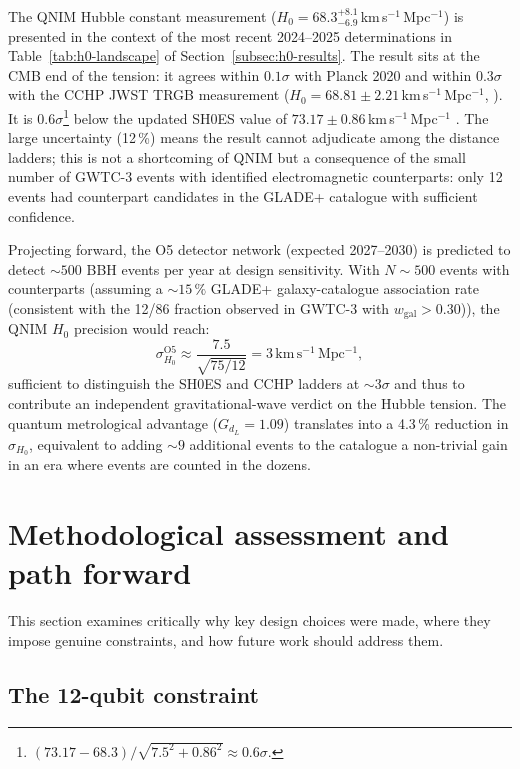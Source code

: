 \documentclass[11pt,a4paper, english]{book}
\theoremstyle{plain}
\theoremstyle{definition}
\numberwithin{equation}{chapter}
\numberwithin{figure}{chapter}
\numberwithin{table}{chapter}
\begin{document}
The QNIM Hubble constant measurement ($H_0 = 68.3^{+8.1}_{-6.9}$\,km\,s$^{-1}$\,Mpc$^{-1}$)
is presented in the context of the most recent 2024--2025 determinations
in Table~\ref{tab:h0-landscape} of Section~\ref{subsec:h0-results}.
The result sits at the CMB end of the tension: it agrees within $0.1\sigma$
with Planck 2020 \cite{Planck_2020} and within $0.3\sigma$ with the CCHP
JWST TRGB measurement ($H_0 = 68.81 \pm 2.21$\,km\,s$^{-1}$\,Mpc$^{-1}$,
\cite{Freedman_2024}).  It is $0.6\sigma$\footnote{$(73.17-68.3)/\sqrt{7.5^2+0.86^2}\approx0.6\sigma$.}
below the updated SH0ES value of
$73.17 \pm 0.86$\,km\,s$^{-1}$\,Mpc$^{-1}$ \cite{Breuval_2024}.
The large uncertainty (12\,\%) means the result cannot adjudicate among
the distance ladders; this is not a shortcoming of QNIM but a consequence
of the small number of GWTC-3 events with identified electromagnetic
counterparts: only 12 events had counterpart candidates in the GLADE+
catalogue with sufficient confidence.

Projecting forward, the O5 detector network (expected 2027--2030) is
predicted to detect $\sim\!500$ BBH events per year at design sensitivity.
With $N \sim 500$ events with counterparts (assuming a $\sim\!15\,\%$ GLADE+ galaxy-catalogue 
association rate (consistent with the 12/86 fraction 
observed in GWTC-3 with $w_\mathrm{gal} > 0.30$)), the QNIM $H_0$ precision would reach:
\begin{equation}
  \label{eq:h0_projection}
  \sigma_{H_0}^{\mathrm{O5}} \approx \frac{7.5}{\sqrt{75/12}}
= 3\,\mathrm{km\,s^{-1}\,Mpc^{-1}},
\end{equation}
sufficient to distinguish the SH0ES and CCHP ladders at $\sim\!3\sigma$
and thus to contribute an independent gravitational-wave verdict on the
Hubble tension.  The quantum metrological advantage ($G_{d_L} = 1.09$)
translates into a 4.3\,\% reduction in $\sigma_{H_0}$, equivalent to
adding $\sim\!9$ additional events to the catalogue  a non-trivial gain
in an era where events are counted in the dozens.

\section{Methodological assessment and path forward}
\label{sec:disc-methodology}

This section examines critically why key design choices were made, where
they impose genuine constraints, and how future work should address them.



\subsection{The 12-qubit constraint}
\label{subsec:disc-12qubit}
\end{document}
